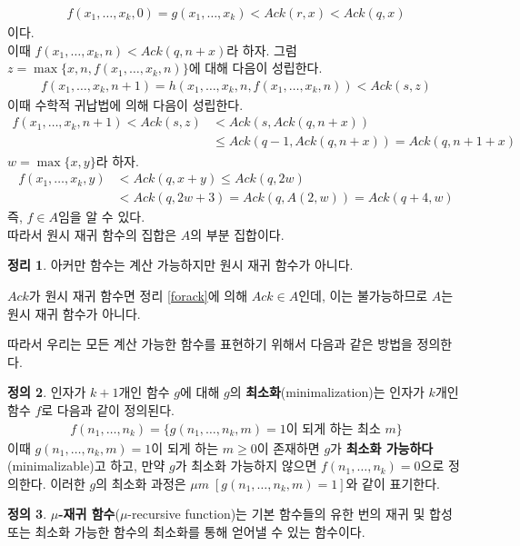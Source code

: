 \documentclass[b5paper, 11pt]{book}
\theoremstyle{definition}
\newtheorem{defn}{정의}[chapter]
\newtheorem{thm}[defn]{정리}
\newenvironment{pf*}{\pushQED{\qed}\pf}
{\popQED\endpf}
\begin{document}
\begin{pf*}
\begin{align*}
        f(x_1, \ldots, x_k, 0) = g(x_1, \ldots, x_k) < Ack(r,x) <Ack(q,x)
    \end{align*}
    이다.\\
    이때 $f(x_1, \ldots,x_k, n) < Ack(q, n+x)$라 하자.  그럼 $z = \max\{x,n,f(x_1, \ldots, x_k, n)\}$에 대해 다음이 성립한다.
    \begin{align}
        f(x_1, \ldots, x_k, n+1) = h(x_1, \ldots, x_k, n, f(x_1,\ldots, x_k ,n)) < Ack(s, z)
    \end{align}
    이때 수학적 귀납법에 의해 다음이 성립한다.
    \begin{align*}
        f(x_1, \ldots, x_k, n+1) < Ack(s, z) &< Ack(s, Ack(q, n+x)) \\ 
       &\le Ack(q-1, Ack(q, n+x)) = Ack(q, n+1+x)
    \end{align*}
    $w = \max\{x,y\}$라 하자. 
    \begin{align*}
        f(x_1, \ldots, x_k, y) &< Ack(q, x+y) \le Ack(q, 2w) \\ 
        &< Ack(q, 2w+3) = Ack(q, A(2,w)) = Ack(q+4, w) 
    \end{align*}
    즉, $f \in A$임을 알 수 있다. \\ 
    따라서 원시 재귀 함수의 집합은 $A$의 부분 집합이다. 
\end{pf*}
\begin{thm}
    아커만 함수는 계산 가능하지만 원시 재귀 함수가 아니다. 
\end{thm}
\begin{pf*}
    $Ack$가 원시 재귀 함수면 정리 \ref{forack}에 의해 $Ack \in A$인데,  이는 불가능하므로 $A$는 원시 재귀 함수가 아니다. 
\end{pf*}
따라서 우리는 모든 계산 가능한 함수를 표현하기 위해서 다음과 같은 방법을 정의한다.
\begin{defn} \label{minimalization}
    인자가 $k+1$개인 함수 $g$에 대해 $g$의 \textbf{최소화}(minimalization)는 인자가 $k$개인 함수 $f$로 다음과 같이 정의된다.
    \begin{align*}
        f(n_1, \ldots, n_k) = \{g(n_1, \ldots, n_k, m) = 1\text{이 되게 하는 최소 } m\}
    \end{align*}
    이때 $g(n_1, \ldots, n_k, m) = 1$이 되게 하는 $m \ge 0$이 존재하면 $g$가 \textbf{최소화 가능하다}(minimalizable)고 하고, 만약 $g$가 최소화 가능하지 않으면 $f(n_1, \ldots, n_k)=0$으로 정의한다. 이러한 $g$의 최소화 과정은 $\mu m \; [g(n_1, \ldots, n_k, m) = 1]$와 같이 표기한다. 
\end{defn}
\begin{defn}
    \textbf{$\mu$-재귀 함수}($\mu$-recursive function)는 기본 
    함수들의 유한 번의 재귀 및 합성 또는 최소화 가능한
    함수의 최소화를 통해 얻어낼 수 있는 함수이다. 
\end{defn}
\end{document}
